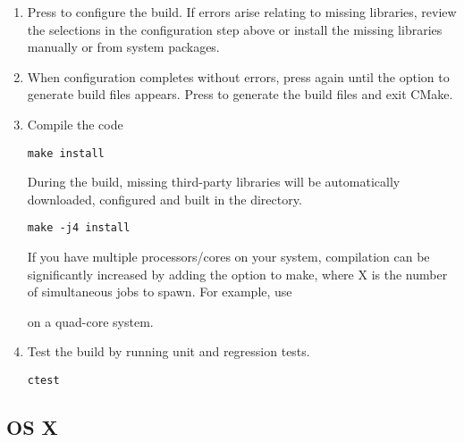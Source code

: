 \begin{enumerate}
    
    \item Press  to configure the build. If errors arise relating to
    missing libraries, review the  selections in
    the configuration step above or install the missing libraries manually or
    from system packages.
    
    \item When configuration completes without errors, press  again
    until the option  to generate build files appears. Press 
    to generate the build files and exit CMake.
    
    \item Compile the code
    \begin{lstlisting}[style=BashInputStyle]
        make install
    \end{lstlisting}
    During the build, missing third-party libraries will be automatically
    downloaded, configured and built in the \nekpp {} directory.
    
    \newsavebox\installationLinuxTip
    \begin{lrbox}{\installationLinuxTip}\begin{minipage}{0.8\linewidth}
    \begin{lstlisting}[style=BashInputStyle]
    make -j4 install
    \end{lstlisting}
    \end{minipage}
    \end{lrbox}
    
    \begin{tipbox}
    If you have multiple processors/cores on your system, compilation can be
    significantly increased by adding the  option to make, where X is
    the number of simultaneous jobs to spawn. For example, use
    
    \noindent\usebox\installationLinuxTip
    
    on a quad-core system.
    \end{tipbox}
    
    \item Test the build by running unit and regression tests.
    \begin{lstlisting}[style=BashInputStyle]
    ctest
    \end{lstlisting}
\end{enumerate}

\subsection{OS X}


